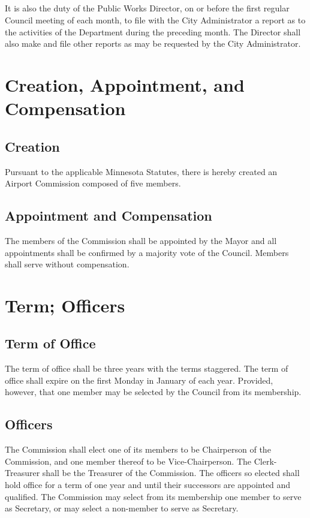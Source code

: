 \subsection{}
It is also the duty of the Public Works Director, on or before the first regular Council meeting of each month, to file with the City Administrator a report as to the activities of the Department during the preceding month.  The Director shall also make and file other reports as may be requested by the City Administrator.\\

\setcounter{section}{99}
\section{Creation, Appointment, and Compensation}
\subsection{Creation}
Pursuant to the applicable Minnesota Statutes, there is hereby created an Airport Commission composed of five members.
\subsection{Appointment and Compensation}
The members of the Commission shall be appointed by the Mayor and all appointments shall be confirmed by a majority vote of the Council.  Members shall serve without compensation.

\section{Term; Officers}
\subsection{Term of Office}
The term of office shall be three years with the terms staggered.  The term of office shall expire on the first Monday in January of each year.  Provided, however, that one member may be selected by the Council from its membership.
\subsection{Officers}
The Commission shall elect one of its members to be Chairperson of the Commission, and one member thereof to be Vice-Chairperson.  The Clerk-Treasurer shall be the Treasurer of the Commission.  The officers so elected shall hold office for a term of one year and until their successors are appointed and qualified.  The Commission may select from its membership one member to serve as Secretary, or may select a non-member to serve as Secretary.

